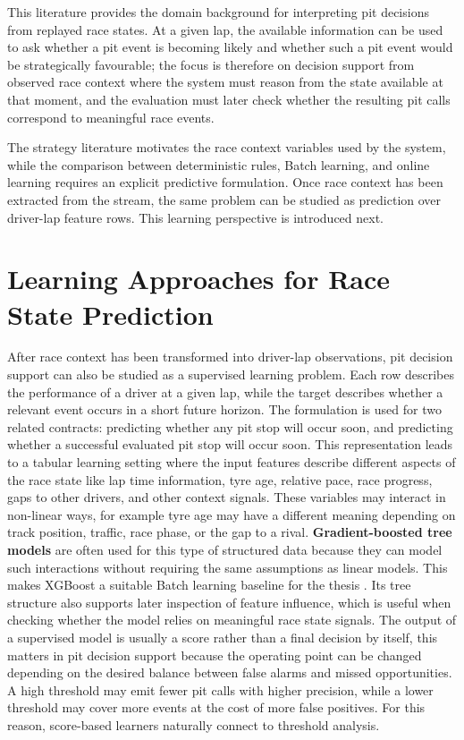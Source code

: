 This literature provides the domain background for interpreting pit decisions from replayed race states. At a given lap, the available information can be
used to ask whether a pit event is becoming likely and whether such a pit event would be strategically favourable; the focus is therefore on decision support from
observed race context where the system must reason from the state available at that moment, and the evaluation must later check whether the resulting pit calls correspond
to meaningful race events.

The strategy literature motivates the race context variables used by the system, while the comparison between deterministic rules, Batch learning, and online learning
requires an explicit predictive formulation. Once race context has been extracted from the stream, the same problem can be studied as prediction over driver-lap feature
rows. This learning perspective is introduced next.


\section{Learning Approaches for Race State Prediction}

After race context has been transformed into driver-lap observations, pit decision support can also be studied as a supervised learning problem.
Each row describes the performance of a driver at a given lap, while the target describes whether a relevant event occurs in a short future horizon.
The formulation is used for two related contracts: predicting whether any pit stop will occur soon, and predicting whether a successful evaluated pit stop
will occur soon.
This representation leads to a tabular learning setting where the input features describe different aspects of the race state like lap time information, tyre age, relative pace,
race progress, gaps to other drivers, and other context signals. These variables may interact in non-linear ways, for example tyre age may have a different meaning
depending on track position, traffic, race phase, or the gap to a rival. \textbf{Gradient-boosted tree models} are often used for this type of structured data because they can model
such interactions without requiring the same assumptions as linear models. This makes XGBoost a suitable Batch learning baseline for the thesis \citep{chen2016xgboost}.
Its tree structure also supports later inspection of feature influence, which is useful when checking whether the model relies on meaningful race state signals.
The output of a supervised model is usually a score rather than a final decision by itself, this matters in pit decision support because the operating point can be
changed depending on the desired balance between false alarms and missed opportunities. A high threshold may emit fewer pit calls with higher precision, while a lower
threshold may cover more events at the cost of more false positives. For this reason, score-based learners naturally connect to threshold analysis.

